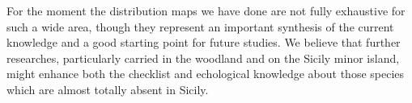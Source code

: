 {For the moment the distribution maps we have done are not fully exhaustive for such a wide area, though they represent an important synthesis of the current knowledge and a good starting point for future studies. We believe that further researches, particularly carried in the woodland and on the Sicily minor island, might enhance both the checklist and echological knowledge about those species which are almost totally absent in Sicily.
} %